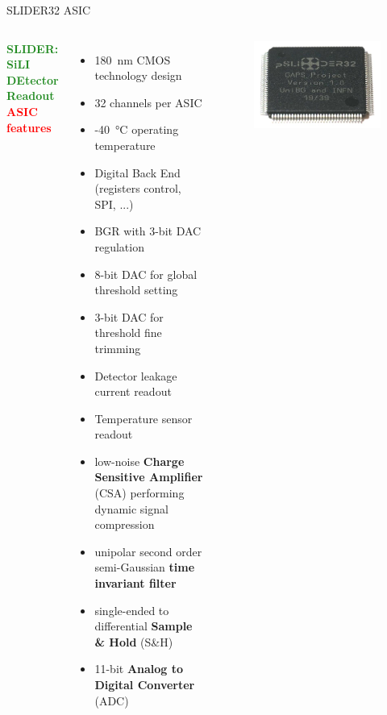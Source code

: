 \documentclass[aspectratio=169,xcolor=dvipsnames,handout]{beamer} %
\begin{document}
\begin{frame}{SLIDER32 ASIC}
   \begin{columns}
        \fontsize{10pt}{1}\selectfont
        \textbf{\textcolor{ForestGreen}{SLIDER: SiLI DEtector Readout}}\\
        \vspace{0.3cm}
        \fontsize{9.5pt}{1}\selectfont
        \textbf{\textcolor{Red}{ASIC features}}
        \vspace{0.1cm}
        \begin{itemize}
            \fontsize{9pt}{1}\selectfont
            \setlength\itemsep{0.3em}
            \item \SI{180}{\nano\meter} CMOS technology design
            \item 32 channels per ASIC
            \item -\SI{40}{\celsius} operating temperature
            \item Digital Back End (registers control, SPI, ...)
            \item BGR with 3-bit DAC regulation
            \item 8-bit DAC for global threshold setting
            \item 3-bit DAC for threshold fine trimming
            \item Detector leakage current readout
            \item Temperature sensor readout
            \item low-noise \textbf{Charge Sensitive Amplifier} (CSA) performing dynamic signal compression
            \item unipolar second order semi-Gaussian \textbf{time invariant filter}
            \item single-ended to differential \textbf{Sample \& Hold} (S\&H)
            \item 11-bit \textbf{Analog to Digital Converter} (ADC)
        \end{itemize}
        \begin{figure}
        \centering
        \vspace{-0.25cm}
        \includegraphics[height=0.2\textheight]{images/backup_slides/SLIDER32_asic_package.jpg}

\end{figure}
\end{columns}
\end{frame}
\end{document}
